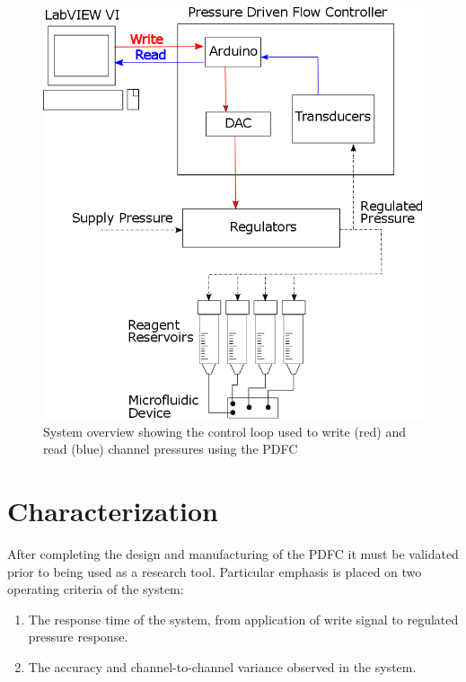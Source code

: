 \begin{figure}[H]
\centering 
\includegraphics[width=1.0\columnwidth]{systemOverview.PNG} 
\caption[System Overview of the PDFC]{System overview showing the control loop used to write (red) and read (blue) channel pressures using the PDFC} 
\label{fig:systemOverview} 
\end{figure}

\clearpage

\section{Characterization}
\label{sec:characterization}


After completing the design and manufacturing of the PDFC it must be validated prior to being used as a research tool. Particular emphasis is placed on two operating criteria of the system:
\begin{enumerate}
\item The response time of the system, from application of write signal to regulated pressure response.
\item The accuracy and channel-to-channel variance observed in the system.
\end{enumerate}

